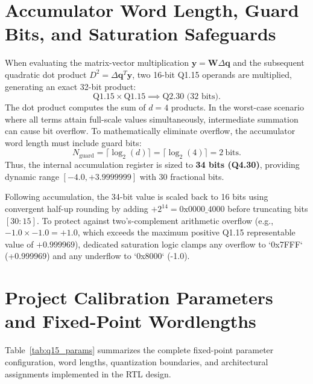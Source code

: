 \documentclass[12pt,a4paper]{report}
\begin{document}
\section{Accumulator Word Length, Guard Bits, and Saturation Safeguards}
When evaluating the matrix-vector multiplication $\boldsymbol{y} = \boldsymbol{W} \Delta\boldsymbol{q}$
and the subsequent quadratic dot product $D^2 = \Delta\boldsymbol{q}^T \boldsymbol{y}$, two 16-bit
Q1.15 operands are multiplied, generating an exact 32-bit product:
\begin{equation}
\text{Q1.15} \times \text{Q1.15} \implies \text{Q2.30 (32 bits)}.
\end{equation}
The dot product computes the sum of $d = 4$ products. In the worst-case scenario where all
terms attain full-scale values simultaneously, intermediate summation can cause bit overflow.
To mathematically eliminate overflow, the accumulator word length must include guard bits:
\begin{equation}
N_{\text{guard}} = \lceil \log_2(d) \rceil = \lceil \log_2(4) \rceil = 2~\text{bits}.
\end{equation}
Thus, the internal accumulation register is sized to \textbf{34 bits (Q4.30)}, providing
dynamic range $[-4.0, +3.9999999]$ with 30 fractional bits.

Following accumulation, the 34-bit value is scaled back to 16 bits using convergent half-up
rounding by adding $+2^{14} = \text{0x0000\_4000}$ before truncating bits $[30:15]$. To protect
against two's-complement arithmetic overflow (e.g., $-1.0 \times -1.0 = +1.0$, which exceeds
the maximum positive Q1.15 representable value of $+0.999969$), dedicated saturation logic
clamps any overflow to `0x7FFF` (+0.999969) and any underflow to `0x8000` (-1.0).

\section{Project Calibration Parameters and Fixed-Point Wordlengths}
Table~\ref{tab:q15_params} summarizes the complete fixed-point parameter configuration,
word lengths, quantization boundaries, and architectural assignments implemented in the
RTL design.
\end{document}
